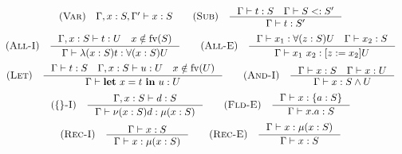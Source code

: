 \[\begin{array}{c}
    \RULE{Var} \quad \TJT{\Gamma, x: S, \Gamma'}{x}{S} \qquad

    \RULE{Sub} \quad \inference{
        \TJT{\Gamma}{t}{S} \quad
        \SJT{\Gamma}{S}{S'}
    }{
        \TJT{\Gamma}{t}{S'}
    } \\[4mm]

    \RULE{All-I} \quad \inference{
        \TJT{\Gamma, x: S}{t}{U} \quad
        x \notin \FV{S}
    }{
        \TJT{\Gamma}{\ABS{x}{S}{t}}{\DFUN{x}{S}{U}}
    } \qquad

    \RULE{All-E} \quad \inference{
        \TJT{\Gamma}{x_1}{\DFUN{z}{S}{U}} \quad
        \TJT{\Gamma}{x_2}{S}
    }{
        \TJT{\Gamma}{x_1\ x_2}{\SUB{z}{x_2}U}
    } \\[4mm]

    \RULE{Let} \quad \inference{
        \TJT{\Gamma}{t}{S} \quad
        \TJT{\Gamma, x: S}{u}{U} \quad
        x \notin \FV{U}
    }{
        \TJT{\Gamma}{\LET{x}{t}{u}}{U}
    } \qquad

    \RULE{And-I} \quad \inference{
        \TJT{\Gamma}{x}{S} \quad
        \TJT{\Gamma}{x}{U}
    }{
        \TJT{\Gamma}{x}{\AGG{S}{U}}
    } \\[4mm]

    \RULE{\{\}-I} \quad \inference{
        \TJT{\Gamma, x: S}{d}{S}
    }{
        \TJT{\Gamma}{\OBJ{x}{S}{d}}{\REC{x}{S}}
    } \qquad

    \RULE{Fld-E} \quad \inference{
        \TJT{\Gamma}{x}{\FDEC{a}{S}}
    }{
        \TJT{\Gamma}{x.a}{S}
    } \\[4mm]

    \RULE{Rec-I} \quad \inference{
        \TJT{\Gamma}{x}{S}
    }{
        \TJT{\Gamma}{x}{\REC{x}{S}}
    } \qquad

    \RULE{Rec-E} \quad \inference{
        \TJT{\Gamma}{x}{\REC{x}{S}}
    }{
        \TJT{\Gamma}{x}{S}
    }
\end{array}\]

